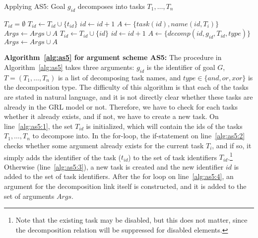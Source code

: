 \begin{algorithm}[h]
  \caption{Applying AS5: Goal $g_{id}$ decomposes into tasks $T_1,\ldots,T_n$}\label{alg:as5}
  \begin{algorithmic}[1]
    \State $T_{id} = \emptyset$\label{alg:as5:1}
        \State $T_{id} \gets T_{id} \cup \{t_{id}\}$
      \Else\label{alg:as5:3}
        \State $id\gets id+1$
        \State $A \gets \{task(id),name(id,T_i)\}$
        \State $Args \gets Args\cup A$
        \State $T_{id} \gets T_{id} \cup \{id\}$
      \EndIf
    \EndFor
    \State $id\gets id+1$\label{alg:as5:4}
    \State $A\gets \{decomp(id, g_{id}, T_{id}, type)\}$
    \State $Args \gets Args\cup A$
    \EndProcedure
  \end{algorithmic}
\end{algorithm}

\noindent\textbf{Algorithm~\ref{alg:as5} for argument scheme AS5:}
The procedure in Algorithm~\ref{alg:as5} takes three arguments: $g_{id}$ is the identifier of goal $G$, $T=(T_1,\ldots,T_n)$ is a list of decomposing task names, and $type\in\{and,or,xor\}$ is the decomposition type. The difficulty of this algorithm is that each of the tasks are stated in natural language, and it is not directly clear whether these tasks are already in the GRL model or not. Therefore, we have to check for each tasks whether it already exists, and if not, we have to create a new task. On line~\ref{alg:as5:1}, the set $T_{id}$ is initialized, which will contain the ids of the tasks $T_1,\ldots,T_n$ to decompose into. In the for-loop, the if-statement on line~\ref{alg:as5:2} checks whether some argument already exists for the current task $T_i$, and if so, it simply adds the identifier of the task ($t_{id}$) to the set of task identifiers $T_{id}$.\footnote{Note that the existing task may be disabled, but this does not matter, since the decomposition relation will be suppressed for disabled elements.} Otherwise (line~\ref{alg:as5:3}), a new task is created and the new identifier $id$ is added to the set of task identifiers. After the for loop on line~\ref{alg:as5:4}, an argument for the decomposition link itself is constructed, and it is added to the set of arguments $Args$.

